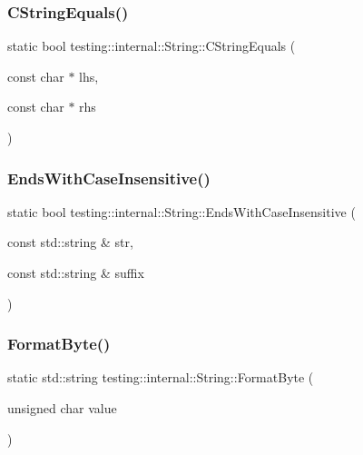 \subsubsection{\texorpdfstring{C\+String\+Equals()}{CStringEquals()}}
{\footnotesize\ttfamily static bool testing\+::internal\+::\+String\+::\+C\+String\+Equals (\begin{DoxyParamCaption}\item[{const char $\ast$}]{lhs,  }\item[{const char $\ast$}]{rhs }\end{DoxyParamCaption})\hspace{0.3cm}{\ttfamily [static]}}

\mbox{\label{classtesting_1_1internal_1_1String_a3de1df085eddc89ef3f3833c67aee3fe}} 
\subsubsection{\texorpdfstring{Ends\+With\+Case\+Insensitive()}{EndsWithCaseInsensitive()}}
{\footnotesize\ttfamily static bool testing\+::internal\+::\+String\+::\+Ends\+With\+Case\+Insensitive (\begin{DoxyParamCaption}\item[{const std\+::string \&}]{str,  }\item[{const std\+::string \&}]{suffix }\end{DoxyParamCaption})\hspace{0.3cm}{\ttfamily [static]}}

\mbox{\label{classtesting_1_1internal_1_1String_ab3555eeb6abe4b7c6f63d865af10379d}} 
\subsubsection{\texorpdfstring{Format\+Byte()}{FormatByte()}}
{\footnotesize\ttfamily static std\+::string testing\+::internal\+::\+String\+::\+Format\+Byte (\begin{DoxyParamCaption}\item[{unsigned char}]{value }\end{DoxyParamCaption})\hspace{0.3cm}{\ttfamily [static]}}

